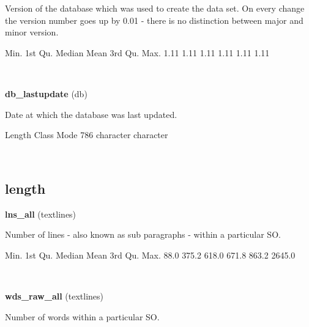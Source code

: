 \documentclass[]{article}
\newenvironment{Shaded}{\begin{snugshade}}{\end{snugshade}}
\newcommand{\DecValTok}[1]{\textcolor[rgb]{0.00,0.00,0.81}{{#1}}}
\newcommand{\FloatTok}[1]{\textcolor[rgb]{0.00,0.00,0.81}{{#1}}}
\newcommand{\NormalTok}[1]{{#1}}
\begin{document}
Version of the database which was used to create the data set. On every
change the version number goes up by 0.01 - there is no distinction
between major and minor version.

\begin{Shaded}
\begin{Highlighting}[]
   \NormalTok{Min. 1st Qu.  Median    Mean 3rd Qu.    Max. }
   \FloatTok{1.11}    \FloatTok{1.11}    \FloatTok{1.11}    \FloatTok{1.11}    \FloatTok{1.11}    \FloatTok{1.11} 
\end{Highlighting}
\end{Shaded}

~

\vspace{1em}

\textbf{db\_lastupdate} (db)

Date at which the database was last updated.

\begin{Shaded}
\begin{Highlighting}[]
   \NormalTok{Length     Class      Mode }
      \DecValTok{786} \NormalTok{character character }
\end{Highlighting}
\end{Shaded}

~

\vspace{1em}

\subsection{length}\label{length}

\textbf{lns\_all} (textlines)

Number of lines - also known as sub paragraphs - within a particular SO.

\begin{Shaded}
\begin{Highlighting}[]
   \NormalTok{Min. 1st Qu.  Median    Mean 3rd Qu.    Max. }
   \FloatTok{88.0}   \FloatTok{375.2}   \FloatTok{618.0}   \FloatTok{671.8}   \FloatTok{863.2}  \FloatTok{2645.0} 
\end{Highlighting}
\end{Shaded}

~

\vspace{1em}

\textbf{wds\_raw\_all} (textlines)

Number of words within a particular SO.
\end{document}
